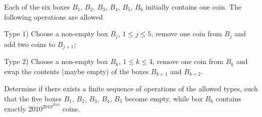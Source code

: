 Each of the six boxes $B_1$,  $B_2$,  $B_3$,  $B_4$,  $B_5$,  $B_6$ initially contains one coin. The following operations are allowed

Type 1) Choose a non-empty box $B_j$,  $1\leq j \leq 5$,  remove one coin from $B_j$ and add two coins to $B_{j+1}$;

Type 2) Choose a non-empty box $B_k$,  $1\leq k \leq 4$,  remove one coin from $B_k$ and swap the contents (maybe empty) of the boxes $B_{k+1}$ and $B_{k+2}$.

Determine if there exists a finite sequence of operations of the allowed types, such that the five boxes $B_1$,  $B_2$,  $B_3$,  $B_4$,  $B_5$ become empty, while box $B_6$ contains exactly $2010^{2010^{2010}}$ coins.